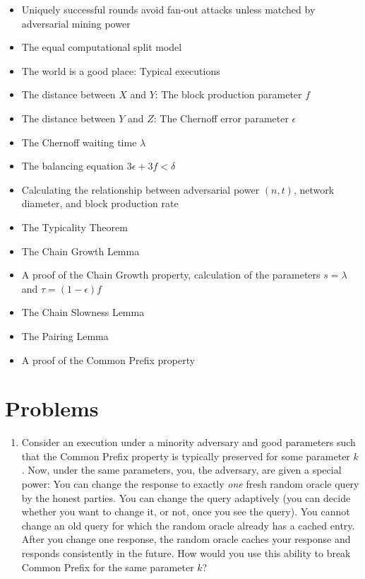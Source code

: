 {\begin{itemize}
\item Uniquely successful rounds avoid fan-out attacks unless matched by adversarial mining power
\item The equal computational split model
\item The world is a good place: Typical executions
\item The distance between $X$ and $Y$: The block production parameter $f$
\item The distance between $Y$ and $Z$: The Chernoff error parameter $\epsilon$
\item The Chernoff waiting time $\lambda$
\item The balancing equation $3\epsilon + 3f < \delta$
\item Calculating the relationship between adversarial power $(n, t)$, network diameter, and block production rate
\item The Typicality Theorem
\item The Chain Growth Lemma
\item A proof of the Chain Growth property, calculation of the parameters $s=\lambda$ and $\tau=(1 - \epsilon)f$
\item The Chain Slowness Lemma
\item The Pairing Lemma
\item A proof of the Common Prefix property
\end{itemize}
}

\section*{Problems}

\begin{enumerate}
  \item Consider an execution under a minority adversary and good parameters such that
        the Common Prefix property is typically preserved for some parameter $k$. Now,
        under the same parameters, you, the adversary, are given a special power: You
        can change the response to exactly \emph{one} fresh random oracle query by the
        honest parties. You can change the query adaptively (you can decide whether you
        want to change it, or not, once you see the query). You cannot change an old query
        for which the random oracle already has a cached entry. After you change one response,
        the random oracle caches your response and responds consistently in the future.
        How would you use this ability to break Common Prefix for the same parameter $k$?
\end{enumerate}

